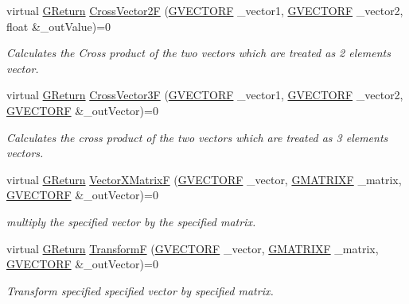 \begin{DoxyCompactItemize}
virtual \hyperlink{namespaceGW_a67a839e3df7ea8a5c5686613a7a3de21}{G\+Return} \hyperlink{classGW_1_1MATH_1_1GVector_a9c8df3e031a91b77a1ea180a8145b9f0}{Cross\+Vector2F} (\hyperlink{structGW_1_1MATH_1_1GVECTORF}{G\+V\+E\+C\+T\+O\+RF} \+\_\+vector1, \hyperlink{structGW_1_1MATH_1_1GVECTORF}{G\+V\+E\+C\+T\+O\+RF} \+\_\+vector2, float \&\+\_\+out\+Value)=0
\begin{DoxyCompactList}\small\item\em Calculates the Cross product of the two vectors which are treated as 2 elements vector. \end{DoxyCompactList}\item 
virtual \hyperlink{namespaceGW_a67a839e3df7ea8a5c5686613a7a3de21}{G\+Return} \hyperlink{classGW_1_1MATH_1_1GVector_a9da6a4d16d2417c6d6f9dee240cad853}{Cross\+Vector3F} (\hyperlink{structGW_1_1MATH_1_1GVECTORF}{G\+V\+E\+C\+T\+O\+RF} \+\_\+vector1, \hyperlink{structGW_1_1MATH_1_1GVECTORF}{G\+V\+E\+C\+T\+O\+RF} \+\_\+vector2, \hyperlink{structGW_1_1MATH_1_1GVECTORF}{G\+V\+E\+C\+T\+O\+RF} \&\+\_\+out\+Vector)=0
\begin{DoxyCompactList}\small\item\em Calculates the cross product of the two vectors which are treated as 3 elements vectors. \end{DoxyCompactList}\item 
virtual \hyperlink{namespaceGW_a67a839e3df7ea8a5c5686613a7a3de21}{G\+Return} \hyperlink{classGW_1_1MATH_1_1GVector_a215565b6f224c48bd00d8625e64a703d}{Vector\+X\+MatrixF} (\hyperlink{structGW_1_1MATH_1_1GVECTORF}{G\+V\+E\+C\+T\+O\+RF} \+\_\+vector, \hyperlink{structGW_1_1MATH_1_1GMATRIXF}{G\+M\+A\+T\+R\+I\+XF} \+\_\+matrix, \hyperlink{structGW_1_1MATH_1_1GVECTORF}{G\+V\+E\+C\+T\+O\+RF} \&\+\_\+out\+Vector)=0
\begin{DoxyCompactList}\small\item\em multiply the specified vector by the specified matrix. \end{DoxyCompactList}\item 
virtual \hyperlink{namespaceGW_a67a839e3df7ea8a5c5686613a7a3de21}{G\+Return} \hyperlink{classGW_1_1MATH_1_1GVector_ad57877d55d7a322db99770af27797957}{TransformF} (\hyperlink{structGW_1_1MATH_1_1GVECTORF}{G\+V\+E\+C\+T\+O\+RF} \+\_\+vector, \hyperlink{structGW_1_1MATH_1_1GMATRIXF}{G\+M\+A\+T\+R\+I\+XF} \+\_\+matrix, \hyperlink{structGW_1_1MATH_1_1GVECTORF}{G\+V\+E\+C\+T\+O\+RF} \&\+\_\+out\+Vector)=0
\begin{DoxyCompactList}\small\item\em Transform specified specified vector by specified matrix. \end{DoxyCompactList}\item 

\end{DoxyCompactItemize}

